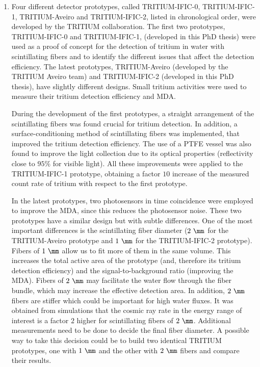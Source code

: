 \begin{enumerate}

\item{} Four different detector prototypes, called TRITIUM-IFIC-0, TRITIUM-IFIC-1, TRITIUM-Aveiro and TRITIUM-IFIC-2, listed in chronological order, were developed by the TRITIUM collaboration. The first two prototypes, TRITIUM-IFIC-0 and TRITIUM-IFIC-1, (developed in this PhD thesis) were used as a proof of concept for the detection of tritium in water with scintillating fibers and to identify the different issues that affect the detection efficiency. The latest prototypes, TRITIUM-Aveiro (developed by the TRITIUM Aveiro team) and TRITIUM-IFIC-2 (developed in this PhD thesis), have slightly different designs. Small tritium activities were used to measure their tritium detection efficiency and MDA. %

During the development of the first prototypes, a straight arrangement of the scintillating fibers was found crucial for tritium detection. In addition, a surface-conditioning method of scintillating fibers was implemented, that improved the tritium detection efficiency. The use of a PTFE vessel was also found to improve the light collection due to its optical properties (reflectivity close to $95\%$ for visible light). All these improvements were applied to the TRITIUM-IFIC-1 prototype, obtaining a factor $10$ increase of the measured count rate of tritium with respect to the first prototype. %

In the latest prototypes, two photosensors in time coincidence were employed to improve the MDA, since this reduces the photosensor noise. These two prototypes have a similar design but with subtle differences. One of the most important differences is the scintillating fiber diameter ($2~\mm$ for the TRITIUM-Aveiro prototype and $1~\mm$ for the TRITIUM-IFIC-2 prototype). Fibers of $1~\mm$ allow us to fit more of them in the same volume. This increases the total active area of the prototype (and, therefore its tritium detection efficiency) and the signal-to-background ratio (improving the MDA). Fibers of $2~\mm$ may facilitate the water flow through the fiber bundle, which may increase the effective detection area. In addition, $2~\mm$ fibers are stiffer which could be important for high water fluxes. It was obtained from simulations that the cosmic ray rate in the energy range of interest is a factor $2$ higher for scintillating fibers of $2~\mm$. Additional measurements need to be done to decide the final fiber diameter. A possible way to take this decision could be to build two identical TRITIUM prototypes, one with $1~\mm$ and the other with $2~\mm$ fibers and compare their results. 


\end{enumerate}
